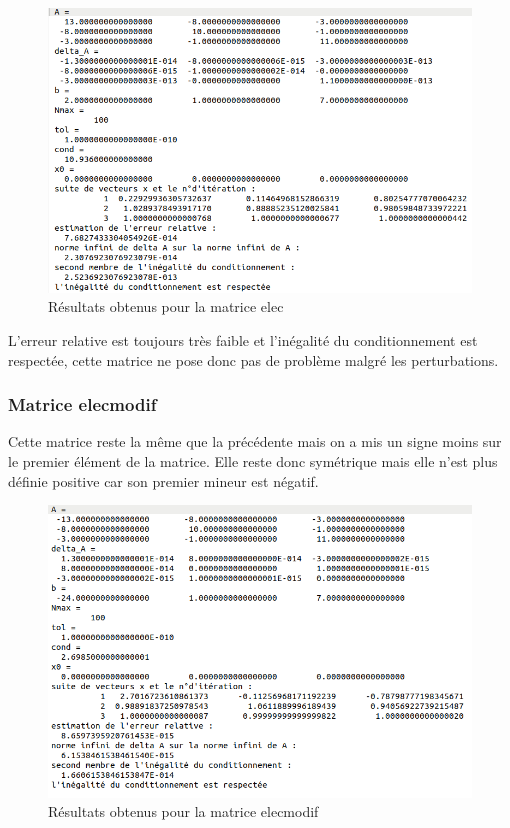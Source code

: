 \documentclass[12,french]{report}
\begin{document}
\begin{figure}[H]
	\centering
	\includegraphics[width=1\textwidth]{./Images/elec_1.res}
	\caption{Résultats obtenus pour la matrice elec}
\end{figure}

L'erreur relative est toujours très faible et l'inégalité du conditionnement est respectée, cette matrice ne pose donc pas de problème malgré les perturbations.

\subsubsection{Matrice elecmodif}

Cette matrice reste la même que la précédente mais on a mis un signe moins sur le premier élément de la matrice. Elle reste donc symétrique mais elle n'est plus définie positive car son premier mineur est négatif. 

\begin{figure}[H]
	\centering
	\includegraphics[width=1\textwidth]{./Images/elecmodif_1.res}
	\caption{Résultats obtenus pour la matrice elecmodif}
\end{figure}
\end{document}
